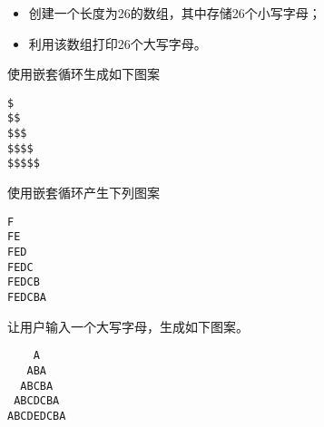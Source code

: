 \begin{frame}[fragile]
\begin{biancheng}[1]
\begin{itemize}
\item 创建一个长度为26的数组，其中存储26个小写字母；\\[.1in]
\item 利用该数组打印26个大写字母。
\end{itemize}
\end{biancheng}
\end{frame}


% 


\begin{frame}[fragile]
\begin{biancheng}[2]
使用嵌套循环生成如下图案
\begin{lstlisting}
$
$$
$$$
$$$$
$$$$$
\end{lstlisting}
\end{biancheng}
\end{frame}

% 

\begin{frame}[fragile]
\begin{biancheng}[3]
使用嵌套循环产生下列图案
\begin{lstlisting}
F
FE
FED
FEDC
FEDCB
FEDCBA
\end{lstlisting}
\end{biancheng}
\end{frame}

% 

\begin{frame}[fragile]
\begin{biancheng}[4]
  让用户输入一个大写字母，生成如下图案。
\begin{lstlisting}
    A
   ABA
  ABCBA
 ABCDCBA
ABCDEDCBA
\end{lstlisting}
\end{biancheng}
\end{frame}

% 

